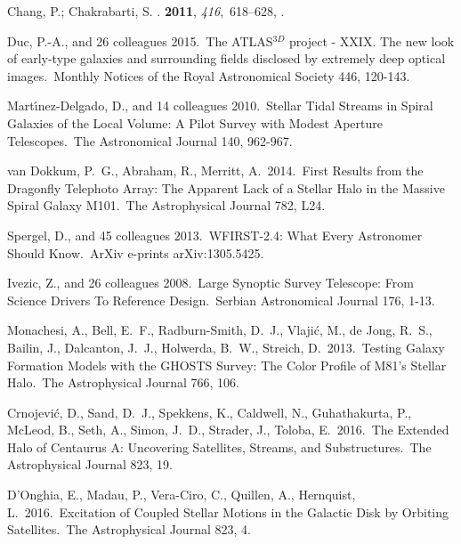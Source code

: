 \begin{thebibliography}{-------}
{Chang}, P.; {Chakrabarti}, S.
.
 {\bf 2011}, {\em 416},~618--628,
  \href{http://xxx.lanl.gov/abs/1102.3436}{{\normalfont [1102.3436]}}.

 Duc, P.-A., and 26 colleagues 2015.\ The ATLAS$^{3D}$ project - XXIX. The new look of early-type galaxies and surrounding fields disclosed by extremely deep optical images.\ Monthly Notices of the Royal Astronomical Society 446, 120-143. 

 Mart{\'{\i}}nez-Delgado, D., and 14 colleagues 2010.\ Stellar Tidal Streams in Spiral Galaxies of the Local Volume: A Pilot Survey with Modest Aperture Telescopes.\ The Astronomical Journal 140, 962-967. 

 van Dokkum, P.~G., Abraham, R., Merritt, A.\ 2014.\ First Results from the Dragonfly Telephoto Array: The Apparent Lack of a Stellar Halo in the Massive Spiral Galaxy M101.\ The Astrophysical Journal 782, L24. 

 Spergel, D., and 45 colleagues 2013.\ WFIRST-2.4: What Every Astronomer Should Know.\ ArXiv e-prints arXiv:1305.5425. 

 Ivezic, Z., and 26 colleagues 2008.\ Large Synoptic Survey Telescope: From Science Drivers To Reference Design.\ Serbian Astronomical Journal 176, 1-13. 

 Monachesi, A., Bell, E.~F., Radburn-Smith, D.~J., Vlaji{\'c}, M., de Jong, R.~S., Bailin, J., Dalcanton, J.~J., Holwerda, B.~W., Streich, D.\ 2013.\ Testing Galaxy Formation Models with the GHOSTS Survey: The Color Profile of M81's Stellar Halo.\ The Astrophysical Journal 766, 106. 

 Crnojevi{\'c}, D., Sand, D.~J., Spekkens, K., Caldwell, N., Guhathakurta, P., McLeod, B., Seth, A., Simon, J.~D., Strader, J., Toloba, E.\ 2016.\ The Extended Halo of Centaurus A: Uncovering Satellites, Streams, and Substructures.\ The Astrophysical Journal 823, 19. 

 D'Onghia, E., Madau, P., Vera-Ciro, C., Quillen, A., Hernquist, L.\ 2016.\ Excitation of Coupled Stellar Motions in the Galactic Disk by Orbiting Satellites.\ The Astrophysical Journal 823, 4. 


\end{thebibliography}

